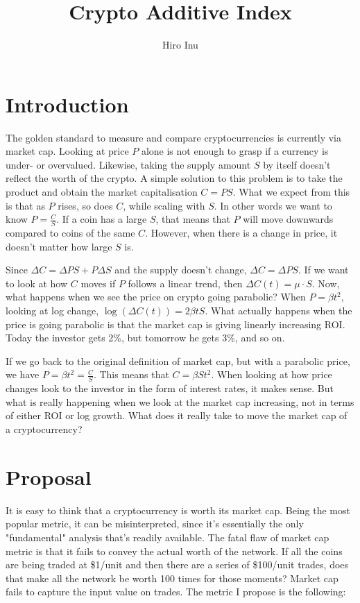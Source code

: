 \documentclass[11pt,a4paper]{article}
\title{Crypto Additive Index}
\author{Hiro Inu}
\begin{document}
 
\maketitle 
\section{Introduction} 

The golden standard to measure and compare cryptocurrencies is currently via market cap. Looking at price $P$ alone is not enough to grasp if a currency is under- or overvalued. Likewise, taking the supply amount ${S}$ by itself doesn't reflect the worth of the crypto. A simple solution to this problem is to take the product and obtain the market capitalisation $C = P  S$. What we expect from this is that as $P$ rises, so does $C$, while scaling with $S$. In other words we want to know $P = \frac{C}{S}$. If a coin has a large $S$, that means that $P$ will move downwards compared to coins of the same $C$. However, when there is a change in price, it doesn't matter how large $S$ is. 

Since $\Delta C = \Delta P  S +  P  \Delta S$ and the supply doesn't change, $\Delta C = \Delta P  S$. If we want to look at how $C$ moves if $P$ follows a linear trend, then $\Delta C(t) = \mu \cdot S$. Now, what happens when we see the price on crypto going parabolic? When $P = \beta t ^ 2$, looking at log change, $\log(\Delta C(t)) = 2 \beta t S$. What actually happens when the price is going parabolic is that the market cap is giving linearly increasing ROI. Today the investor gets 2\%, but tomorrow he gets 3\%, and so on. 

If we go back to the original definition of market cap, but with a parabolic price, we have $P = \beta t ^ 2 = \frac{C}{S}$. This means that $C = \beta S t ^ 2$. When looking at how price changes look to the investor in the form of interest rates, it makes sense. But what is really happening when we look at the market cap increasing, not in terms of either ROI or log growth. What does it really take to move the market cap of a cryptocurrency? 


\newpage

\section{Proposal}

It is easy to think that a cryptocurrency is worth its market cap. Being the most popular metric, it can be misinterpreted, since it's essentially the only "fundamental" analysis that's readily available. The fatal flaw of market cap metric is that it fails to convey the actual worth of the network. If all the coins are being traded at \$1/unit and then there are a series of \$100/unit trades, does that make all the network be worth 100 times for those moments? Market cap fails to capture the input value on trades. The metric I propose is the following:
\end{document}

